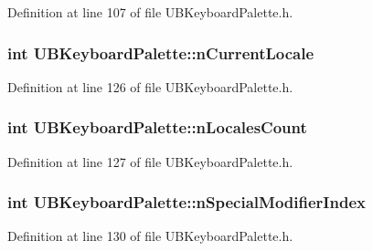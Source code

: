 Definition at line 107 of file U\-B\-Keyboard\-Palette.\-h.

\hypertarget{class_u_b_keyboard_palette_a5cc143fd2f778206618afad6f0dcb2b6}{
\subsubsection[{n\-Current\-Locale}]{\setlength{\rightskip}{0pt plus 5cm}int U\-B\-Keyboard\-Palette\-::n\-Current\-Locale\hspace{0.3cm}{\ttfamily [protected]}}}\label{d6/d6e/class_u_b_keyboard_palette_a5cc143fd2f778206618afad6f0dcb2b6}


Definition at line 126 of file U\-B\-Keyboard\-Palette.\-h.

\hypertarget{class_u_b_keyboard_palette_a8607ac73d82334965befc3e8580fcb4b}{
\subsubsection[{n\-Locales\-Count}]{\setlength{\rightskip}{0pt plus 5cm}int U\-B\-Keyboard\-Palette\-::n\-Locales\-Count\hspace{0.3cm}{\ttfamily [protected]}}}\label{d6/d6e/class_u_b_keyboard_palette_a8607ac73d82334965befc3e8580fcb4b}


Definition at line 127 of file U\-B\-Keyboard\-Palette.\-h.

\hypertarget{class_u_b_keyboard_palette_ae4cd6698472f172cffa56aa9104f4bdc}{
\subsubsection[{n\-Special\-Modifier\-Index}]{\setlength{\rightskip}{0pt plus 5cm}int U\-B\-Keyboard\-Palette\-::n\-Special\-Modifier\-Index\hspace{0.3cm}{\ttfamily [protected]}}}\label{d6/d6e/class_u_b_keyboard_palette_ae4cd6698472f172cffa56aa9104f4bdc}


Definition at line 130 of file U\-B\-Keyboard\-Palette.\-h.

